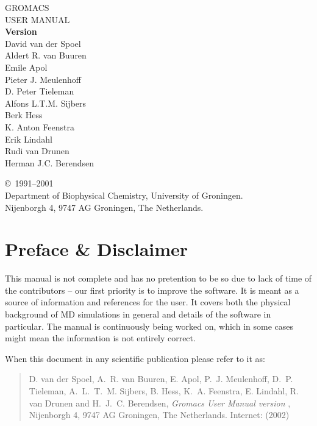 \documentclass[11pt,a4paper,twoside]{gmxmanual}
\begin{document}
\begin{center}
\phantom{ }
\vspace{1cm}
{\fontsize{40}{50} \selectfont 
GROMACS\\
USER MANUAL\\[1cm]
}
{\LARGE\bf Version \gmxver}\\[1cm]
{\Large 
David van der Spoel     \\
Aldert R. van Buuren    \\
Emile Apol              \\
Pieter J. Meulenhoff    \\
D. Peter Tieleman       \\
Alfons L.T.M. Sijbers   \\
Berk Hess               \\
K. Anton Feenstra       \\
Erik Lindahl            \\
Rudi van Drunen         \\
Herman J.C. Berendsen \\
}
\end{center}

\vfill

{\center
\copyright\ 1991--2001  \\
Department of Biophysical Chemistry, University of Groningen. \\
Nijenborgh 4, 9747 AG Groningen, The Netherlands.\\
}

\newpage
\pagestyle{fancyplain}

\section*{Preface \& Disclaimer}
This manual is not complete and has no pretention to be so due
to lack of time of the contributors -- our first priority is to improve
the software. It is meant as a source of
information and references for the {\gromacs} user.  It covers both the
physical background of MD simulations in general and details of 
the {\gromacs} software in particular. The manual is 
continuously being worked on,
which in some cases might mean the information is not entirely correct.

When  this document in any scientific publication
please refer to it as:

\begin{quote}
\raggedright
D. van der Spoel, A.~R. van Buuren, E. Apol, P.~J. Meulenhoff, D.~P.
Tieleman, A.~L.~T.~M. Sij\-bers, B. Hess, K.~A. Feenstra, E. Lindahl,
R. van Drunen and H.~J.~C. Berendsen,
\hspace{0.3em} {\em Gromacs {U}ser {M}anual version \gmxver},
\hspace{0.3em} Nij\-enborgh 4, 9747 AG Groningen, The Netherlands.
Internet: {\wwwpage} (2002)
\end{quote}
\end{document}
